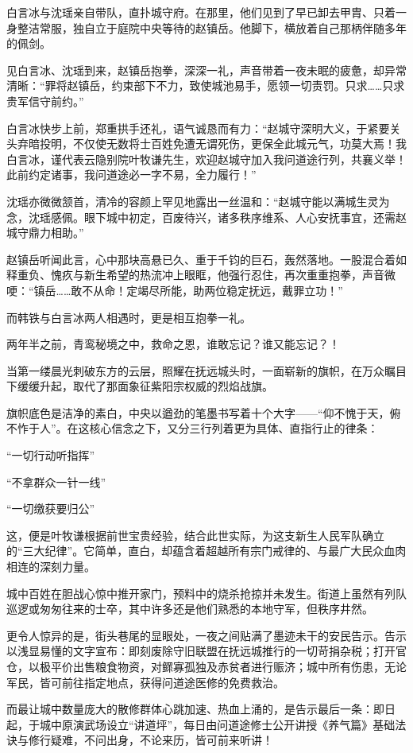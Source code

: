白言冰与沈瑶亲自带队，直扑城守府。在那里，他们见到了早已卸去甲胄、只着一身整洁常服，独自立于庭院中央等待的赵镇岳。他脚下，横放着自己那柄伴随多年的佩剑。

见白言冰、沈瑶到来，赵镇岳抱拳，深深一礼，声音带着一夜未眠的疲惫，却异常清晰：“罪将赵镇岳，约束部下不力，致使城池易手，愿领一切责罚。只求……只求贵军信守前约。”

白言冰快步上前，郑重拱手还礼，语气诚恳而有力：“赵城守深明大义，于紧要关头弃暗投明，不仅使无数将士百姓免遭无谓死伤，更保全此城元气，功莫大焉！我白言冰，谨代表云隐别院叶牧谦先生，欢迎赵城守加入我问道途行列，共襄义举！此前约定诸事，我问道途必一字不易，全力履行！”

沈瑶亦微微颔首，清冷的容颜上罕见地露出一丝温和：“赵城守能以满城生灵为念，沈瑶感佩。眼下城中初定，百废待兴，诸多秩序维系、人心安抚事宜，还需赵城守鼎力相助。”

赵镇岳听闻此言，心中那块高悬已久、重于千钧的巨石，轰然落地。一股混合着如释重负、愧疚与新生希望的热流冲上眼眶，他强行忍住，再次重重抱拳，声音微哽：“镇岳……敢不从命！定竭尽所能，助两位稳定抚远，戴罪立功！”

而韩铁与白言冰两人相遇时，更是相互抱拳一礼。

两年半之前，青鸾秘境之中，救命之恩，谁敢忘记？谁又能忘记？！

当第一缕晨光刺破东方的云层，照耀在抚远城头时，一面崭新的旗帜，在万众瞩目下缓缓升起，取代了那面象征紫阳宗权威的烈焰战旗。

旗帜底色是洁净的素白，中央以遒劲的笔墨书写着十个大字——“仰不愧于天，俯不怍于人”。在这核心信念之下，又分三行列着更为具体、直指行止的律条：

“一切行动听指挥”

“不拿群众一针一线”

“一切缴获要归公”

这，便是叶牧谦根据前世宝贵经验，结合此世实际，为这支新生人民军队确立的“三大纪律”。它简单，直白，却蕴含着超越所有宗门戒律的、与最广大民众血肉相连的深刻力量。

城中百姓在胆战心惊中推开家门，预料中的烧杀抢掠并未发生。街道上虽然有列队巡逻或匆匆往来的士卒，其中许多还是他们熟悉的本地守军，但秩序井然。

更令人惊异的是，街头巷尾的显眼处，一夜之间贴满了墨迹未干的安民告示。告示以浅显易懂的文字宣布：即刻废除守旧联盟在抚远城推行的一切苛捐杂税；打开官仓，以极平价出售粮食物资，对鳏寡孤独及赤贫者进行赈济；城中所有伤患，无论军民，皆可前往指定地点，获得问道途医修的免费救治。

而最让城中数量庞大的散修群体心跳加速、热血上涌的，是告示最后一条：即日起，于城中原演武场设立“讲道坪”，每日由问道途修士公开讲授《养气篇》基础法诀与修行疑难，不问出身，不论来历，皆可前来听讲！

